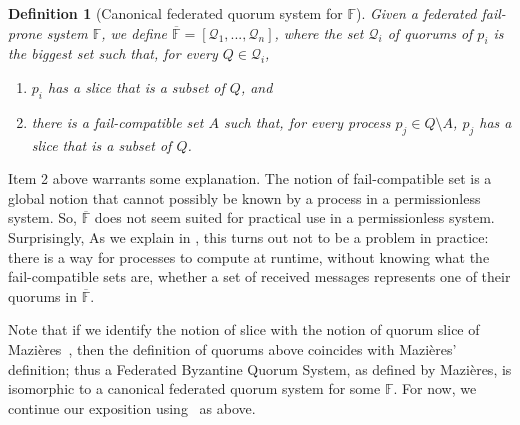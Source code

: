 \documentclass[11pt]{article}
\newtheorem{definition}{Definition}
\begin{document}
\begin{definition}[Canonical federated quorum system for $\mathbb{F}$]
  \label{def:canonical}
  Given a federated fail-prone system $\mathbb{F}$, we define $\overline{\mathbb{F}}=\left[\mathcal{Q}_1,...,\mathcal{Q}_n\right]$, where the set $\mathcal{Q}_i$ of quorums of $p_i$ is the biggest set such that, for every $Q\in\mathcal{Q}_i$,
  \begin{enumerate}
    \item $p_i$ has a slice that is a subset of $Q$, and
    \item there is a fail-compatible set $A$ such that, for every process $p_j\in Q\setminus A$, $p_j$ has a slice that is a subset of $Q$.%
  \end{enumerate}
\end{definition}

Item 2 above warrants some explanation.
The notion of fail-compatible set is a global notion that cannot possibly be known by a process in a permissionless system.
So, $\overline{\mathbb{F}}$ does not seem suited for practical use in a permissionless system.
Surprisingly, As we explain in , this turns out not to be a problem in practice: there is a way for processes to compute at runtime, without knowing what the fail-compatible sets are, whether a set of received messages represents one of their quorums in $\overline{\mathbb{F}}$.

Note that if we identify the notion of slice with the notion of quorum slice of Mazières~\cite{MazieresStellarConsensusProtocol2015}, then the definition of quorums above coincides with Mazières' definition; thus a Federated Byzantine Quorum System, as defined by Mazières, is isomorphic to a canonical federated quorum system for some $\mathbb{F}$.
For now, we continue our exposition using~ as above.
\end{document}
